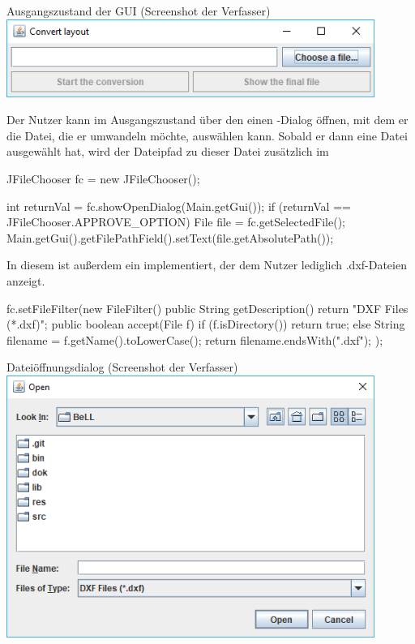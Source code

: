 \begin{Bild}{Ausgangszustand der GUI (Screenshot der Verfasser)}
	\includegraphics[width = 120mm]{Bilder/GUI_0}
\end{Bild}

Der Nutzer kann im Ausgangszustand über den  einen -Dialog öffnen, mit dem er die Datei, die er umwandeln möchte, auswählen kann.
Sobald er dann eine Datei ausgewählt hat, wird der Dateipfad zu dieser Datei zusätzlich im 
\begin{code} 
JFileChooser fc = new JFileChooser();

int returnVal = fc.showOpenDialog(Main.getGui());
if (returnVal == JFileChooser.APPROVE_OPTION) {
	File file = fc.getSelectedFile();
	Main.getGui().getFilePathField().setText(file.getAbsolutePath());
}
\end{code}

In diesem  ist außerdem ein  implementiert, der dem Nutzer lediglich .dxf-Dateien anzeigt.

\begin{code} 
fc.setFileFilter(new FileFilter() {
	public String getDescription() {
		return "DXF Files (*.dxf)";
	}
	public boolean accept(File f) {
		if (f.isDirectory()) {
			return true;
		} else {
			String filename = f.getName().toLowerCase();
			return filename.endsWith(".dxf");
		}
	}
});
\end{code}
\begin{Bild}{Dateiöffnungsdialog (Screenshot der Verfasser)}
	\includegraphics[width = 120mm]{Bilder/GUI_1_FileSelect}
\end{Bild}

